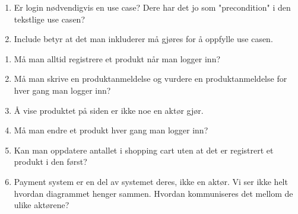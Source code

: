 
\begin{enumerate}
\item Er login nødvendigvis en use case? Dere har det jo som "precondition" i den tekstlige use casen? 
\item Include betyr at det man inkluderer må gjøres for å oppfylle use casen.
\end{enumerate}
\begin{enumerate}

\item{
Må man alltid registrere et produkt når man logger inn?
}

\item{
Må man skrive en produktanmeldelse og vurdere en produktanmeldelse for hver gang man logger inn?
}

\item{
Å vise produktet på siden er ikke noe en aktør gjør.
}

\item{
Må man endre et produkt hver gang man logger inn?
}

\item{
Kan man oppdatere antallet i shopping cart uten at det er registrert et produkt i den først?
}

\item{
Payment system er en del av systemet deres, ikke en aktør. Vi ser ikke helt hvordan diagrammet henger sammen. Hvordan kommuniseres det mellom de ulike aktørene?
}

\end{enumerate}